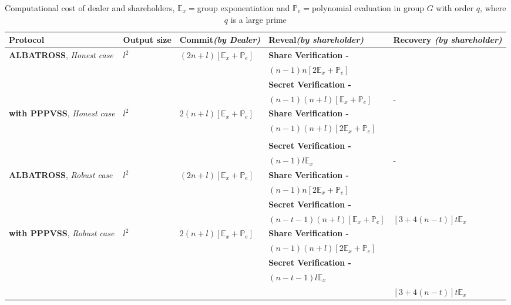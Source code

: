 \begin{table}[htbp]
\centering
\begin{tabular}{|p{3cm}|p{1.2cm}|p{2.5cm}|p{5.5cm}|p{2.5cm}|}
\hline
\textbf{Protocol}    & \textbf{Output size}    & 
\textbf{Commit}\textit{(by Dealer)} & \textbf{Reveal}\textit{(by 
shareholder)} & \textbf{Recovery} \textit{(by shareholder)}                                                           
\\ \hline
\textbf{ALBATROSS}, \textit{Honest case}    & $l^2$ & 
$(2n+l)[\mathbb{E}_x+\mathbb{P}_e]$ & \textbf{Share Verification - }  &  
\\
& & & $(n-1)n[2\mathbb{E}_x+\mathbb{P}_e]$ & \\
& & & \textbf{Secret Verification - } & \\ 
& & & $(n-1)(n+l)[\mathbb{E}_x+\mathbb{P}_e]$&- \\ \hline
\textbf{with PPPVSS}, \textit{Honest case}    & $l^2$  & 
$2(n+l)[\mathbb{E}_x+\mathbb{P}_e]$ & \textbf{Share Verification - } &  \\ 
& & & $(n-1)(n+l)[2\mathbb{E}_x+\mathbb{P}_e]$ &  \\ 
& & & &  \\
& & & \textbf{Secret Verification - } & \\ 
& & & $(n-1)l\mathbb{E}_x$ & -  \\ \hline
\textbf{ALBATROSS}, \textit{Robust case}    & $l^2$ & 
$(2n+l)[\mathbb{E}_x+\mathbb{P}_e]$ & \textbf{Share Verification - }  &  
\\
& & & $(n-1)n[2\mathbb{E}_x+\mathbb{P}_e]$ & \\
& & & \textbf{Secret Verification - } & \\ 
& & & $(n-t-1)(n+l)[\mathbb{E}_x+\mathbb{P}_e]$& 
$[3+4(n-t)]t\mathbb{E}_{x}$\\ \hline
\textbf{with PPPVSS}, \textit{Robust case}    & $l^2$  & 
$2(n+l)[\mathbb{E}_x+\mathbb{P}_e]$ & \textbf{Share Verification - } &  \\ 
& & & $(n-1)(n+l)[2\mathbb{E}_x+\mathbb{P}_e]$ &  \\
& & & \textbf{Secret Verification - } & \\ 
& & & $(n-t-1)l\mathbb{E}_x$ &   \\
& & & & $[3+4(n-t)]t\mathbb{E}_{x}$  \\ \hline

\end{tabular}
\caption{Computational cost of dealer and shareholders, 
$\mathbb{E}_x=$group exponentiation and $\mathbb{P}_e=$polynomial 
evaluation in group $G$ with order $q$, where $q$ is a large prime}
\label{tab:comp_alba_pppvss_no group mul}
\end{table}

